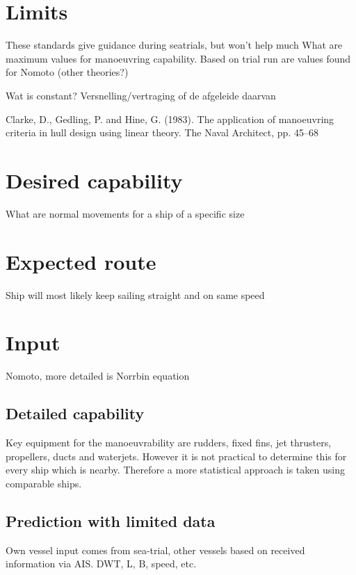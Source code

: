 \section*{Limits}
These standards give guidance during seatrials, but won't help much 
What are maximum values for manoeuvring capability. Based on trial run are values found for Nomoto (other theories?)

Wat is constant? Versnelling/vertraging of de afgeleide daarvan

Clarke, D., Gedling, P. and Hine, G. (1983). The application of manoeuvring criteria in hull design using linear theory. The Naval Architect, pp. 45–68

\section*{Desired capability}
What are normal movements for a ship of a specific size

\section*{Expected route}
Ship will most likely keep sailing straight and on same speed

\section*{Input}
Nomoto, more detailed is Norrbin equation

\subsection*{Detailed capability}
Key equipment for the manoeuvrability are rudders, fixed fins, jet thrusters, propellers, ducts and waterjets. However it is not practical to determine this for every ship which is nearby. Therefore a more statistical approach is taken using comparable ships.






\subsection*{Prediction with limited data}
Own vessel input comes from sea-trial, other vessels based on received information via AIS.
DWT, L, B, speed, etc.

